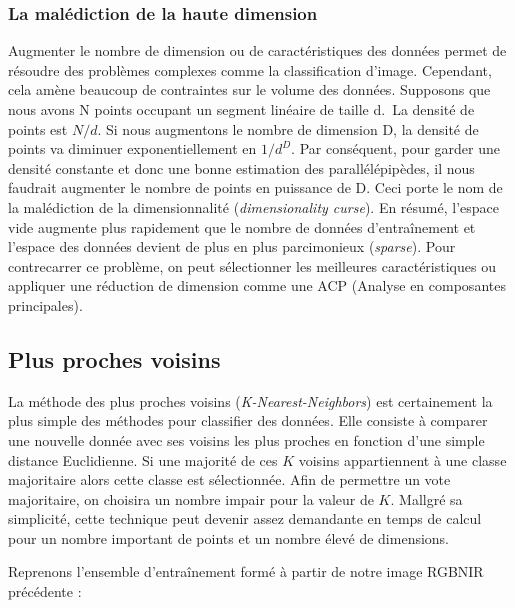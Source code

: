 \documentclass[
  11pt,
  letterpaper,
  open=any,
  twoside=false,
  french]{scrbook}
\begin{document}
\subsubsection{La malédiction de la haute
dimension}\label{la-maluxe9diction-de-la-haute-dimension}

Augmenter le nombre de dimension ou de caractéristiques des données
permet de résoudre des problèmes complexes comme la classification
d'image. Cependant, cela amène beaucoup de contraintes sur le volume des
données. Supposons que nous avons N points occupant un segment linéaire
de taille d.~La densité de points est \(N/d\). Si nous augmentons le
nombre de dimension D, la densité de points va diminuer
exponentiellement en \(1/d^D\). Par conséquent, pour garder une densité
constante et donc une bonne estimation des parallélépipèdes, il nous
faudrait augmenter le nombre de points en puissance de D. Ceci porte le
nom de la malédiction de la dimensionnalité (\emph{dimensionality
curse}). En résumé, l'espace vide augmente plus rapidement que le nombre
de données d'entraînement et l'espace des données devient de plus en
plus parcimonieux (\emph{sparse}). Pour contrecarrer ce problème, on
peut sélectionner les meilleures caractéristiques ou appliquer une
réduction de dimension comme une ACP (Analyse en composantes
principales).

\subsection{Plus proches voisins}\label{plus-proches-voisins}

La méthode des plus proches voisins (\emph{K-Nearest-Neighbors}) est
certainement la plus simple des méthodes pour classifier des données.
Elle consiste à comparer une nouvelle donnée avec ses voisins les plus
proches en fonction d'une simple distance Euclidienne. Si une majorité
de ces \(K\) voisins appartiennent à une classe majoritaire alors cette
classe est sélectionnée. Afin de permettre un vote majoritaire, on
choisira un nombre impair pour la valeur de \(K\). Mallgré sa
simplicité, cette technique peut devenir assez demandante en temps de
calcul pour un nombre important de points et un nombre élevé de
dimensions.

Reprenons l'ensemble d'entraînement formé à partir de notre image RGBNIR
précédente :
\end{document}
